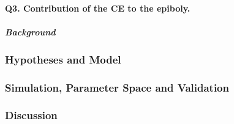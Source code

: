 \paragraph{Q3. Contribution of the CE to the epiboly.}

\subparagraph{Background}







\subsubsection{Hypotheses and Model  }

\subsubsection{Simulation, Parameter Space and Validation }

\subsubsection{Discussion  }
